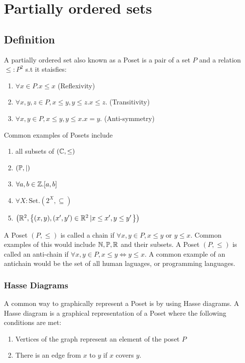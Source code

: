 \chapter{Partially ordered sets}

\section{Definition}

A partially ordered set also known as a Poset is a pair of a set $P$
and a relation $\le \colon P^2$ s.t it staisfies:
\begin{enumerate}
  \item $\forall x \in P. x \le x$ (Reflexivity)
  \item $\forall x, y, z \in P, x \le y, y \le z. x \le z.$ (Transitivity)
  \item $\forall x, y \in P, x \le y, y \le x. x = y.$ (Anti-symmetry)
\end{enumerate}

Common examples of Posets include
\begin{enumerate}
  \item all subsets of $(\mathbb{C}, \le)$
  \item $(\mathbb{P}, \mid)$
  \item $\forall a, b \in \mathbb{Z}. [a,b]$
  \item $\forall X: \text{Set}. (2^X, \subseteq)$
  \item $\left(\mathbb{R}^2, \left\{(x, y), (x', y') \in \mathbb{R}^2 \left| x \le
    x', y \le y'\right.\right\}\right)$
\end{enumerate}

\begin{tcolorbox}[colframe=blue!50, title=Chains and Anti-chains]
  A Poset $(P, \le)$ is called a chain if $\forall x, y \in P, x \le
  y \text{ or } y \le x$.
  Common examples of this would include $\mathbb{N}, \mathbb{P}, \mathbb{R}$ and their subsets.
  \tcblower
  A Poset $(P, \le)$ is called an anti-chain if $\forall x, y \in P,
  x \le y \iff y \le x$.
  A common example of an antichain would be the set of all human
  laguages, or programming languages.
\end{tcolorbox}

\subsection{Hasse Diagrams}
A common way to graphically represent a Poset is by using Hasse diagrams.
A Hasse diagram is a graphical representation of a Poset where the
following conditions are met:
\begin{enumerate}
  \item Vertices of the graph represent an element of the poset $P$
  \item There is an edge from $x$ to $y$ if $x$ covers $y$.
\end{enumerate}

